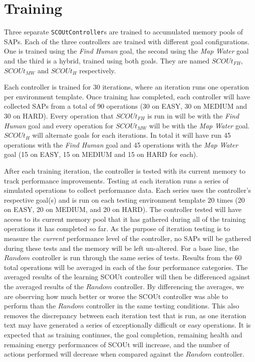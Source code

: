 \section{Training} \label{sec:training}
Three separate \texttt{SCOUtController}s are trained to accumulated memory pools of SAPs.
Each of the three controllers are trained with different goal configurations.
One is trained using the \textit{Find Human} goal, the second using the \textit{Map Water} goal and the third is a hybrid, trained using both goals.
They are named $SCOUt_{FH}$, $SCOUt_{MW}$ and $SCOUt_{H}$ respectively.

Each controller is trained for 30 iterations, where an iteration runs one operation per environment template.
Once training has completed, each controller will have collected SAPs from a total of 90 operations (30 on EASY, 30 on MEDIUM and 30 on HARD).
Every operation that $SCOUt_{FH}$ is run in will be with the \textit{Find Human} goal and every operation for $SCOUt_{MW}$ will be with the \textit{Map Water} goal.
$SCOUt_{H}$ will alternate goals for each iterations.
In total it will have run 45 operations with the \textit{Find Human} goal and 45 operations with the \textit{Map Water} goal (15 on EASY, 15 on MEDIUM and 15 on HARD for each).

After each training iteration, the controller is tested with its current memory to track performance improvements.
Testing at each iteration runs a series of simulated operations to collect performance data.
Each series uses the controller's respective goal(s) and is run on each testing environment template 20 times (20 on EASY, 20 on MEDIUM, and 20 on HARD).
The controller tested will have access to its current memory pool that it has gathered during all of the training operations it has completed so far.
As the purpose of iteration testing is to measure the \textit{current} performance level of the controller, no SAPs will be gathered during these tests and the memory will be left un-altered.
For a base line, the $Random$ controller is run through the same series of tests.
Results from the 60 total operations will be averaged in each of the four performance categories.
The averaged results of the learning SCOUt controller will then be differenced against the averaged results of the $Random$ controller.
By differencing the averages, we are observing how much better or worse the SCOUt controller was able to perform than the $Random$ controller in the same testing conditions.
This also removes the discrepancy between each iteration test that is run, as one iteration text may have generated a series of exceptionally difficult or easy operations.
It is expected that as training continues, the goal completion, remaining health and remaining energy performances of SCOUt will increase, and the number of actions performed will decrease when compared against the $Random$ controller.

